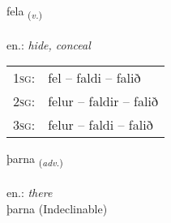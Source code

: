 \documentclass[frontgrid, backgrid]{flacards}\usepackage[]{graphicx}\usepackage[]{xcolor}
\begin{document}
\renewcommand{\flhead}{\vskip5pt \fboxsep=0pt {\small\bfseries\footnotesize Sagnorð | Verb}}
\renewcommand{\fcfoot}{\vskip5pt \fboxsep=0pt \hspace{2pt}{\small\bfseries\footnotesize 1K}}

\renewcommand{\blhead}{\vskip5pt {\small\bfseries\footnotesize Sagnorð | Verb }}
\renewcommand{\bcfoot}{\vskip5pt \hspace{2pt}{\small\bfseries\footnotesize 1K}}


{fela \small{\textsubscript{(\textit{v.})}} \\[1ex] %
\textphonetic{[fɛːla]} \\
en.: \emph{hide, conceal} \\  [2ex]
\renewcommand*{\arraystretch}{0.8}
\begin{tabular}{p{1cm}l}
\textsc{1sg}: & fel -- faldi -- falið \\ 
\textsc{2sg}: & felur -- faldir -- falið \\ 
\textsc{3sg}: & felur -- faldi -- falið \\ 
\end{tabular}
}


\renewcommand{\flhead}{\vskip5pt \fboxsep=0pt {\small\bfseries\footnotesize Atviksorð | Adverb}}
\renewcommand{\fcfoot}{\vskip5pt \fboxsep=0pt \hspace{2pt}{\small\bfseries\footnotesize 1K}}

\renewcommand{\blhead}{\vskip5pt {\small\bfseries\footnotesize Atviksorð | Adverb }}
\renewcommand{\bcfoot}{\vskip5pt \hspace{2pt}{\small\bfseries\footnotesize 1K}}


{þarna \small{\textsubscript{(\textit{adv.})}} \\[1ex]
\textphonetic{[θartna]} \\
en.: \emph{there} \\  [2ex]
þarna (Indeclinable)}

\renewcommand{\flhead}{\vskip5pt \fboxsep=0pt {\small\bfseries\footnotesize Lýsingarorð | Adjective}}
\renewcommand{\fcfoot}{\vskip5pt \fboxsep=0pt \hspace{2pt}{\small\bfseries\footnotesize 1K}}
\end{document}
